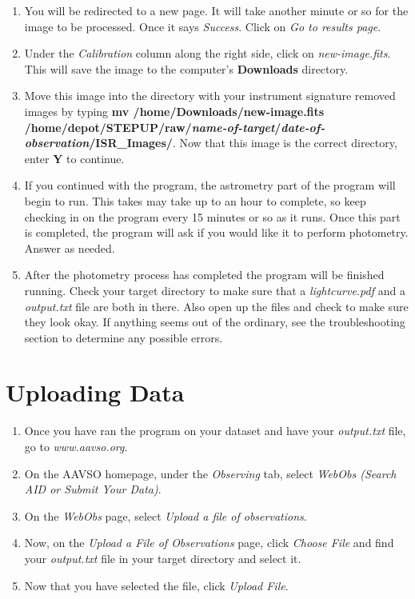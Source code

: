 \documentclass[11pt]{report}
\begin{document}
\begin{enumerate}
\item You will be redirected to a new page. It will take another minute or so for the image to be processed. Once it says \emph{Success}. Click on \emph{Go to results page}.
\item Under the \emph{Calibration} column along the right side, click on \emph{new-image.fits}. This will save the image to the computer's {\bf Downloads} directory.
\item Move this image into the directory with your instrument signature removed images by typing {\bf mv /home/Downloads/new-image.fits /home/depot/STEPUP/raw/\emph{name-of-target}/\emph{date-of-observation}/ISR\_Images/}. Now that this image is the correct directory, enter {\bf Y} to continue.
\item If you continued with the program, the astrometry part of the program will begin to run. This takes may take up to an hour to complete, so keep checking in on the program every 15 minutes or so as it runs. Once this part is completed, the program will ask if you would like it to perform photometry. Answer as needed.
\item After the photometry process has completed the program will be finished running. Check your target directory to make sure that a \emph{lightcurve.pdf} and a \emph{output.txt} file are both in there. Also open up the files and check to make sure they look okay. If anything seems out of the ordinary, see the troubleshooting section to determine any possible errors.
\end{enumerate}

\chapter{Uploading Data}
\begin{enumerate}
\item Once you have ran the program on your dataset and have your \emph{output.txt} file, go to \emph{www.aavso.org}.
\item On the AAVSO homepage, under the \emph{Observing} tab, select \emph{WebObs (Search AID or Submit Your Data)}.
\item On the \emph{WebObs} page, select \emph{Upload a file of observations}.
\item Now, on the \emph{Upload a File of Observations} page, click \emph{Choose File} and find your \emph{output.txt} file in your target directory and select it.
\item Now that you have selected the file, click \emph{Upload File}.
\end{enumerate}

\end{document}
